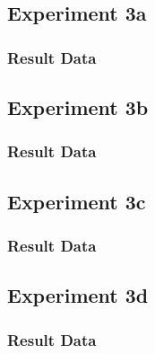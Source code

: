 	\subsection{Experiment 3a}
	\label{sec:A_Exp3a}
		\subsubsection{Result Data}
		\label{sec:A_Exp3a_Data}

\subsection{Experiment 3b}
\label{sec:A_Exp3b}
	\subsubsection{Result Data}
	\label{sec:A_Exp3b_Data}

	\subsection{Experiment 3c}
	\label{sec:A_Exp3c}
		\subsubsection{Result Data}
		\label{sec:A_Exp3c_Data}
	
	\subsection{Experiment 3d}
	\label{sec:A_Exp3d}
		\subsubsection{Result Data}
		\label{sec:A_Exp3d_Data}

